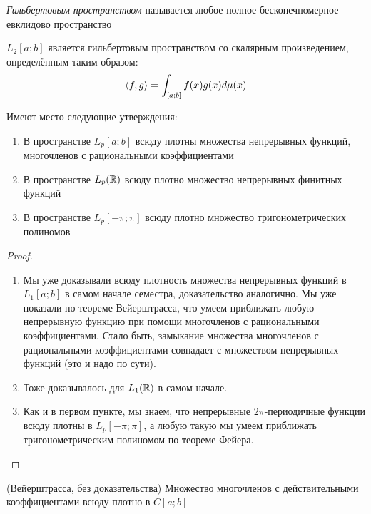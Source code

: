 \begin{definition}
	\textit{Гильбертовым пространством} называется любое полное бесконечномерное евклидово пространство
\end{definition}

\begin{corollary}
	$L_2[a; b]$ является гильбертовым пространством со скалярным произведением, определённым таким образом:
	\[
		\left\langle f, g\right\rangle = \int_{[a; b]} f(x)g(x)d\mu(x)
	\]
\end{corollary}

\begin{theorem}
	Имеют место следующие утверждения:
	\begin{enumerate}
		\item В пространстве $L_p[a; b]$ всюду плотны множества непрерывных функций, многочленов с рациональными коэффициентами
		
		\item В пространстве $L_p(\mathbb{R})$ всюду плотно множество непрерывных финитных функций
		
		\item В пространстве $L_p[-\pi; \pi]$ всюду плотно множество тригонометрических полиномов
	\end{enumerate}
\end{theorem}

\begin{proof}~
	\begin{enumerate}
		\item Мы уже доказывали всюду плотность множества непрерывных функций в $L_1[a; b]$ в самом начале семестра, доказательство аналогично. Мы уже показали по теореме Вейерштрасса, что умеем приближать любую непрерывную функцию при помощи многочленов с рациональными коэффициентами. Стало быть, замыкание множества многочленов с рациональными коэффициентами совпадает с множеством непрерывных функций (это и надо по сути).
		
		\item Тоже доказывалось для $L_1(\mathbb{R})$ в самом начале.
		
		\item Как и в первом пункте, мы знаем, что непрерывные $2\pi$-периодичные функции всюду плотны в $L_p[-\pi; \pi]$, а любую такую мы умеем приближать тригонометрическим полиномом по теореме Фейера.
	\end{enumerate}
\end{proof}

\begin{theorem} (Вейерштрасса, без доказательства)
	Множество многочленов с действительными коэффициентами всюду плотно в $C[a; b]$
\end{theorem}

